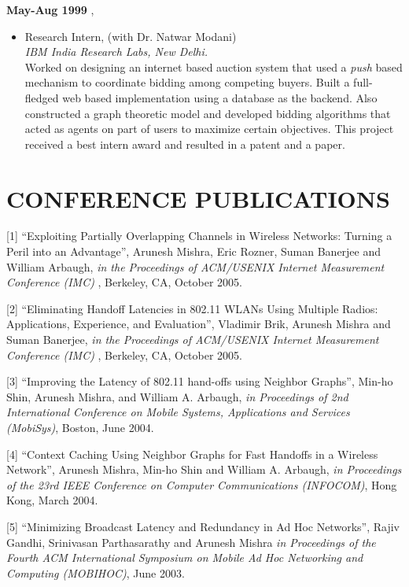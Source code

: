 \begin{resume}
 {\bf May-Aug 1999 },   	
    \begin{itemize}
         \item[] Research Intern, (with Dr. Natwar Modani)\\
		{\em IBM India Research Labs, New Delhi.}\\
		Worked on designing an internet based auction system that used a {\em push} based mechanism to
                coordinate bidding among competing buyers. Built a full-fledged web based implementation using a database as the
                backend. Also constructed a graph theoretic model and developed bidding algorithms that
                acted as agents on part of users to maximize certain objectives. This project received a best intern award
                and resulted in a patent and a paper.

    \end{itemize}


\section{CONFERENCE PUBLICATIONS}
\vspace{0.5cm}

[1] ``Exploiting Partially Overlapping Channels in Wireless Networks: Turning a Peril into an Advantage'',
Arunesh Mishra, Eric Rozner, Suman Banerjee and William Arbaugh, {\em in the Proceedings of ACM/USENIX Internet Measurement Conference (IMC)}
, Berkeley, CA, October 2005.

[2] ``Eliminating Handoff Latencies in 802.11 WLANs Using Multiple Radios: Applications, Experience, and Evaluation'', 
Vladimir Brik, Arunesh Mishra and Suman Banerjee, {\em in the Proceedings of ACM/USENIX Internet Measurement Conference (IMC)}
, Berkeley, CA, October 2005.


[3] ``Improving the Latency of 802.11 hand-offs using Neighbor Graphs'', Min-ho Shin, Arunesh Mishra, and William A. Arbaugh,
{\em in Proceedings of 2nd International Conference on Mobile Systems, Applications and Services (MobiSys)}, Boston, June 2004.


[4] ``Context Caching Using Neighbor Graphs for Fast Handoffs in a Wireless Network'', Arunesh Mishra, 
Min-ho Shin and William A. Arbaugh, {\em in Proceedings of the 23rd IEEE Conference on
 Computer Communications (INFOCOM)}, Hong Kong, March 2004.



[5] ``Minimizing Broadcast Latency and Redundancy in Ad Hoc Networks'', Rajiv Gandhi, Srinivasan Parthasarathy and
Arunesh Mishra {\em in Proceedings of the Fourth ACM International Symposium on
Mobile Ad Hoc Networking and Computing (MOBIHOC)}, June 2003.


\end{resume}
